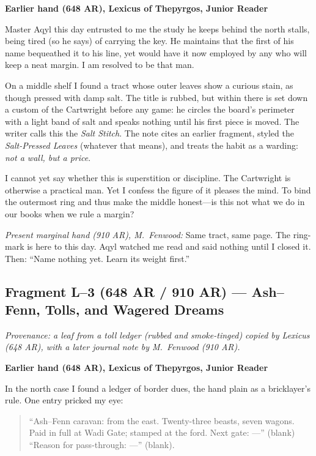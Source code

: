 \documentclass[11pt]{article}
\begin{document}
\medskip
\noindent\textbf{Earlier hand (648 AR), Lexicus of Thepyrgos, Junior Reader}

Master Aqyl this day entrusted to me the study he keeps behind the north stalls, being tired (so he says) of carrying the key. He maintains that the first of his name bequeathed it to his line, yet would have it now employed by any who will keep a neat margin. I am resolved to be that man.

On a middle shelf I found a tract whose outer leaves show a curious stain, as though pressed with damp salt. The title is rubbed, but within there is set down a custom of the Cartwright before any game: he circles the board's perimeter with a light band of salt and speaks nothing until his first piece is moved. The writer calls this the \textit{Salt Stitch}. The note cites an earlier fragment, styled the \textit{Salt-Pressed Leaves} (whatever that means), and treats the habit as a warding: \emph{not a wall, but a price}.

I cannot yet say whether this is superstition or discipline. The Cartwright is otherwise a practical man. Yet I confess the figure of it pleases the mind. To bind the outermost ring and thus make the middle honest---is this not what we do in our books when we rule a margin?

\medskip
\noindent\textit{Present marginal hand (910 AR), M.\ Fenwood:} Same tract, same page. The ring-mark is here to this day. Aqyl watched me read and said nothing until I closed it. Then: ``Name nothing yet. Learn its weight first.''


\subsection{Fragment L--3 (648 AR / 910 AR) --- Ash--Fenn, Tolls, and Wagered Dreams}
\label{frag:l3}
{}

\noindent\textit{Provenance: a leaf from a toll ledger (rubbed and smoke-tinged) copied by Lexicus (648 AR), with a later journal note by M.\ Fenwood (910 AR).}

\medskip
\noindent\textbf{Earlier hand (648 AR), Lexicus of Thepyrgos, Junior Reader}

In the north case I found a ledger of border dues, the hand plain as a bricklayer’s rule. One entry pricked my eye:

\begin{quote}
\small
``Ash--Fenn caravan: from the east. Twenty-three beasts, seven wagons. Paid in full at Wadi Gate; stamped at the ford. Next gate: ---'' (blank) ``Reason for pass-through: ---'' (blank).
\end{quote}
\end{document}
